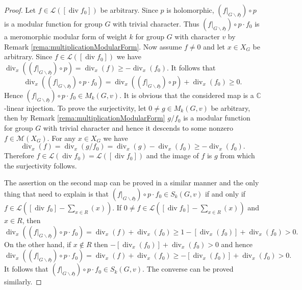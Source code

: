 \documentclass[12pt]{amsart}
\numberwithin{equation}{section}
\theoremstyle{plain}
\theoremstyle{definition}
\theoremstyle{remark}
\renewcommand\div{\mathop{\mathrm{div}}}
\newcommand\numC{\mathbb{C}}
\newcommand\uhp{\mathfrak{H}}
\begin{document}
\begin{proof}
Let $f\in\mathscr{L}([\div f_0])$ be arbitrary. Since $p$ is holomorphic, $(f\vert_{G\backslash\uhp})\circ p$ is a modular function for group $G$ with trivial character. Thus $(f\vert_{G\backslash\uhp})\circ p \cdot f_0$ is a meromorphic modular form of weight $k$ for group $G$ with character $v$ by Remark \ref{rema:multiplicationModularForm}. Now assume $f\neq 0$ and let $x\in X_G$ be arbitrary. Since $f\in\mathscr{L}([\div f_0])$ we have $\div_x((f\vert_{G\backslash\uhp})\circ p)=\div_x(f)\geq -\div_x(f_0)$. It follows that
\[
\div\nolimits_x((f\vert_{G\backslash\uhp})\circ p \cdot f_0)=\div\nolimits_x((f\vert_{G\backslash\uhp})\circ p)+\div\nolimits_x(f_0) \geq 0.
\]
Hence $(f\vert_{G\backslash\uhp})\circ p \cdot f_0\in M_k(G,v)$. It is obvious that the considered map is a $\numC$-linear injection. To prove the surjectivity, let $0\neq g\in M_k(G,v)$ be arbitrary, then by Remark \ref{rema:multiplicationModularForm} $g/f_0$ is a modular function for group $G$ with trivial character and hence it descends to some nonzero $f\in\mathscr{M}(X_G)$. For any $x\in X_G$ we have
\[
\div\nolimits_x(f)=\div\nolimits_x(g/f_0)=\div\nolimits_x(g)-\div\nolimits_x(f_0)\geq-\div\nolimits_x(f_0).
\]
Therefore $f\in \mathscr{L}(\div f_0)=\mathscr{L}([\div f_0])$ and the image of $f$ is $g$ from which the surjectivity follows.

The assertion on the second map can be proved in a similar manner and the only thing that need to explain is that $(f\vert_{G\backslash\uhp})\circ p \cdot f_0\in S_k(G,v)$ if and only if $f\in\mathscr{L}\left([\div f_0]-\sum\nolimits_{x\in R}(x)\right)$. If $0\neq f\in\mathscr{L}\left([\div f_0]-\sum\nolimits_{x\in R}(x)\right)$ and $x\in R$, then
\[
\div\nolimits_x((f\vert_{G\backslash\uhp})\circ p \cdot f_0)=\div\nolimits_x(f)+\div\nolimits_x(f_0) \geq 1-[\div\nolimits_x(f_0)]+\div\nolimits_x(f_0)>0.
\]
On the other hand, if $x\not\in R$ then $-[\div\nolimits_x(f_0)]+\div\nolimits_x(f_0)>0$ and hence
\[
\div\nolimits_x((f\vert_{G\backslash\uhp})\circ p \cdot f_0)=\div\nolimits_x(f)+\div\nolimits_x(f_0) \geq -[\div\nolimits_x(f_0)]+\div\nolimits_x(f_0)>0.
\]
It follows that $(f\vert_{G\backslash\uhp})\circ p \cdot f_0\in S_k(G,v)$. The converse can be proved similarly.
\end{proof}
\end{document}
